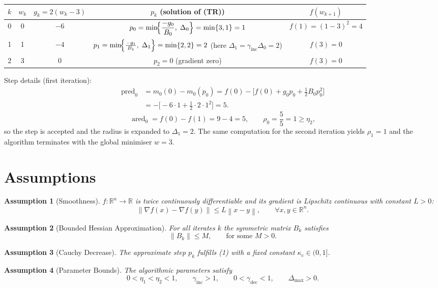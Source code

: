 \documentclass{article}
\newtheorem{assumption}{Assumption}
\newcommand{\norm}[1]{\left\lVert#1\right\rVert}
\newcommand{\R}{\mathbb{R}}
\begin{document}
\begin{center}
\begin{tabular}{c|c|c|c|c}
\(k\) & \(w_k\) & \(g_k=2(w_k-3)\) & \(p_k\) (solution of (TR)) & \(f(w_{k+1})\)\\\hline
0 & 0 & \(-6\) & 
\(\displaystyle p_0 = \min\!\Bigl\{\frac{-g_0}{B_0},\;\Delta_0\Bigr\}
 = \min\{3,1\}=1\) & 
\(f(1) = (1-3)^2 = 4\)\\[2mm]
1 & 1 & \(-4\) & 
\(p_1 = \min\!\Bigl\{\frac{-g_1}{B_1},\;\Delta_1\Bigr\}
 = \min\{2,2\}=2\) (here \(\Delta_1=\gamma_{\mathrm{inc}}\Delta_0=2\))
 & 
\(f(3)=0\)\\[2mm]
2 & 3 & \(0\) & 
\(p_2 = 0\) (gradient zero) &
\(f(3)=0\)\\
\end{tabular}
\end{center}

\noindent
Step details (first iteration):
\[
\begin{aligned}
\operatorname{pred}_0 &= m_0(0)-m_0(p_0)
 = f(0)-\bigl[f(0)+g_0 p_0+\tfrac12 B_0 p_0^2\bigr] \\
 &= -\bigl[-6\cdot 1+ \tfrac12\cdot2\cdot1^2\bigr]
 = 5 .
\end{aligned}
\]
\[
\operatorname{ared}_0 = f(0)-f(1)=9-4=5,\qquad 
\rho_0=\frac{5}{5}=1\ge\eta_2,
\]
so the step is accepted and the radius is expanded to \(\Delta_1=2\).  
The same computation for the second iteration yields \(\rho_1=1\) and the
algorithm terminates with the global minimiser \(w=3\).

\section*{Assumptions}
\begin{assumption}[Smoothness]\label{ass:smooth}
\(f:\R^{n}\rightarrow\R\) is twice continuously differentiable and its gradient
is Lipschitz continuous with constant \(L>0\):
\[
\norm{\nabla f(x)-\nabla f(y)}\le L\norm{x-y},\qquad\forall x,y\in\R^{n}.
\]
\end{assumption}
\begin{assumption}[Bounded Hessian Approximation]\label{ass:hessian}
For all iterates \(k\) the symmetric matrix \(B_k\) satisfies
\[
\|B_k\|\le M,\qquad \text{for some } M>0.
\]
\end{assumption}
\begin{assumption}[Cauchy Decrease]\label{ass:cauchy}
The approximate step \(p_k\) fulfills (1) with a fixed constant
\(\kappa_{\mathrm{c}}\in(0,1]\).
\end{assumption}
\begin{assumption}[Parameter Bounds]\label{ass:params}
The algorithmic parameters satisfy
\[
0<\eta_1<\eta_2<1,\qquad
\gamma_{\mathrm{inc}}>1,\qquad
0<\gamma_{\mathrm{dec}}<1,\qquad
\Delta_{\max}>0.
\]
\end{assumption}
\end{document}
